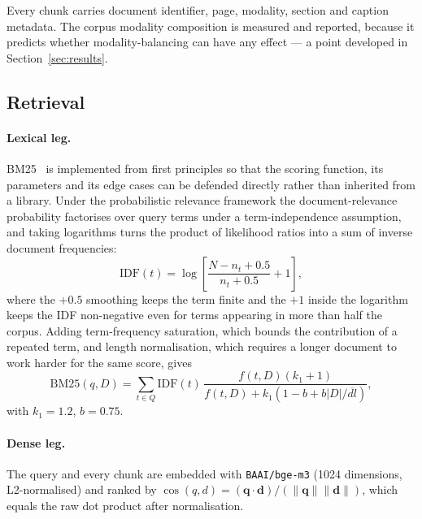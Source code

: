 \documentclass[preprint,3p,times]{elsarticle}
\begin{document}
Every chunk carries document identifier, page, modality, section and caption
metadata. The corpus modality composition is measured and reported, because it
predicts whether modality-balancing can have any effect --- a point developed
in Section~\ref{sec:results}.

\subsection{Retrieval}

\paragraph{Lexical leg.} BM25~\cite{robertson2004prf} is implemented from first
principles so that the scoring function, its parameters and its edge cases can
be defended directly rather than inherited from a library. Under the
probabilistic relevance framework the document-relevance probability factorises
over query terms under a term-independence assumption, and taking logarithms
turns the product of likelihood ratios into a sum of inverse document
frequencies:
\begin{equation}
\mathrm{IDF}(t)=\log\left[\frac{N-n_t+0.5}{n_t+0.5}+1\right],
\end{equation}
where the $+0.5$ smoothing keeps the term finite and the $+1$ inside the
logarithm keeps the IDF non-negative even for terms appearing in more than half
the corpus. Adding term-frequency saturation, which bounds the contribution of
a repeated term, and length normalisation, which requires a longer document to
work harder for the same score, gives
\begin{equation}
\mathrm{BM25}(q,D)=\sum_{t\in Q}\mathrm{IDF}(t)\,
\frac{f(t,D)(k_1+1)}{f(t,D)+k_1\left(1-b+b\lvert D\rvert/\overline{dl}\right)},
\end{equation}
with $k_1=1.2$, $b=0.75$.

\paragraph{Dense leg.} The query and every chunk are embedded with
\texttt{BAAI/bge-m3} (1024 dimensions, L2-normalised)
and ranked by $\cos(q,d)=(\mathbf{q}\cdot\mathbf{d})/(\lVert\mathbf{q}\rVert\lVert\mathbf{d}\rVert)$,
which equals the raw dot product after normalisation.
\end{document}
